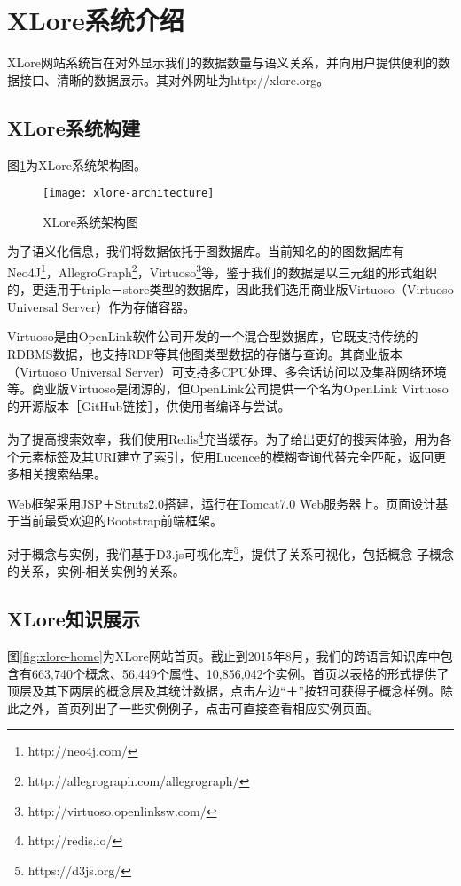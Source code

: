 \section{XLore系统介绍}
\label{sec5:system-describe}
XLore网站系统旨在对外显示我们的数据数量与语义关系，并向用户提供便利的数据接口、清晰的数据展示。其对外网址为http://xlore.org。

\subsection{XLore系统构建}
图\ref{fig:xlore-architecture}为XLore系统架构图。

\begin{figure}[H]
  \centering
  \texttt{[image: xlore-architecture]}
  \caption{XLore系统架构图}
  \label{fig:xlore-architecture}
\end{figure}

为了语义化信息，我们将数据依托于图数据库。当前知名的的图数据库有Neo4J\footnote{http://neo4j.com/}，AllegroGraph\footnote{http://allegrograph.com/allegrograph/}，Virtuoso\footnote{http://virtuoso.openlinksw.com/}等，鉴于我们的数据是以三元组的形式组织的，更适用于triple－store类型的数据库，因此我们选用商业版Virtuoso（Virtuoso Universal Server）作为存储容器。

Virtuoso是由OpenLink软件公司开发的一个混合型数据库，它既支持传统的RDBMS数据，也支持RDF等其他图类型数据的存储与查询。其商业版本（Virtuoso Universal Server）可支持多CPU处理、多会话访问以及集群网络环境等。商业版Virtuoso是闭源的，但OpenLink公司提供一个名为OpenLink Virtuoso的开源版本［GitHub链接］，供使用者编译与尝试。

为了提高搜索效率，我们使用Redis\footnote{http://redis.io/}充当缓存。为了给出更好的搜索体验，用为各个元素标签及其URI建立了索引，使用Lucence的模糊查询代替完全匹配，返回更多相关搜索结果。

Web框架采用JSP＋Struts2.0搭建，运行在Tomcat7.0 Web服务器上。页面设计基于当前最受欢迎的Bootstrap前端框架。

对于概念与实例，我们基于D3.js可视化库\footnote{https://d3js.org/}，提供了关系可视化，包括概念-子概念的关系，实例-相关实例的关系。

\subsection{XLore知识展示}
图\ref{fig:xlore-home}为XLore网站首页。截止到2015年8月，我们的跨语言知识库中包含有663,740个概念、56,449个属性、10,856,042个实例。首页以表格的形式提供了顶层及其下两层的概念层及其统计数据，点击左边“＋”按钮可获得子概念样例。除此之外，首页列出了一些实例例子，点击可直接查看相应实例页面。

